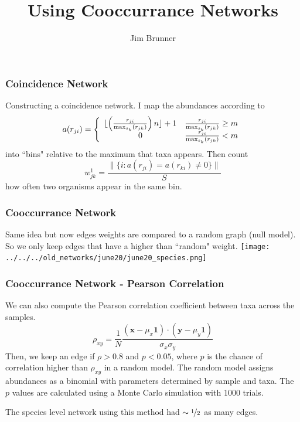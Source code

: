 \documentclass{beamer}
\author[Brunner]{Jim Brunner}
\institute[LANL]{Los Alamos National Laboratory}
\title{Using Cooccurrance Networks}
\date{}
\newcommand{\nhalf}{\nicefrac{1}{2}}
\renewcommand{\b}{\bm}
\begin{document}
\begin{frame}
\titlepage
\end{frame}
\begin{frame}
\frametitle{Coincidence Network}
Constructing a coincidence network.
I map the abundances according to
\[
a(r_{ji})  = \left\{
\begin{array}{c c}
\lfloor\left(\frac{r_{ji}}{\max_{s_k}(r_{jk})}\right) n \rfloor + 1 &  \frac{r_{ji}}{\max_{s_k}(r_{jk})} \geq m \\
0 & \frac{r_{ji}}{\max_{s_k}(r_{jk})} < m
\end{array}
\right.
\]
into ``bins" relative to the maximum that taxa appears. Then count 
\[
w^1_{jk} = \frac{\|\{i: a(r_{ji}) = a(r_{ki}) \neq 0\} \|}{S}
\]
how often two organisms appear in the same bin.
\end{frame}
\begin{frame}
\frametitle{Cooccurrance Network}
Same idea but now edges weights are compared to a random graph (null model). 
So we only keep edges that have a higher than ``random" weight.
\texttt{[image: ../../../old\_networks/june20/june20\_species.png]}
\end{frame}
\begin{frame}
\frametitle{Cooccurrance Network - Pearson Correlation}
We can also compute the Pearson correlation coefficient between taxa across the samples. 
\[
\rho_{xy} = \frac{1}{N}\frac{(\b{x}- \mu_x\b{1}) \cdot (\b{y} - \mu_y\b{1})}{\sigma_x \sigma_y}
\]
Then, we keep an edge if $\rho > 0.8$ and $p< 0.05$, where $p$ is the chance of correlation higher than $\rho_{xy}$ in a random model. The random model assigns abundances as a binomial with parameters determined by sample and taxa. The $p$ values are calculated using a Monte Carlo simulation with 1000 trials. 

The species level network using this method had $\sim \nhalf$ as many edges.
\end{frame}
\end{document}
